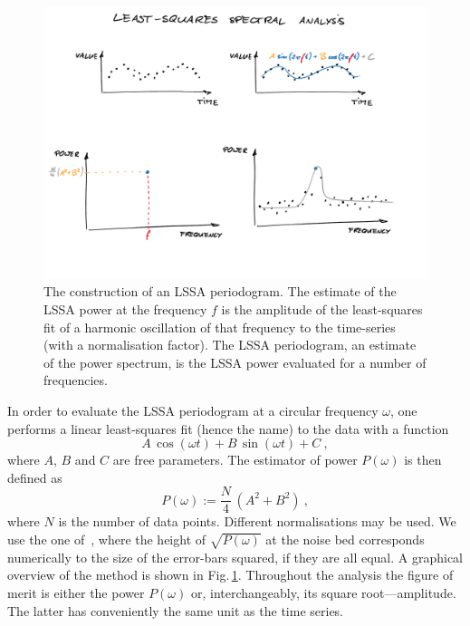 \begin{figure}
  \centering \includegraphics[width=\linewidth]{gfx/axions/LSSA}
  \caption{The construction of an LSSA periodogram. The estimate of the LSSA power at the frequency $f$ is the amplitude of the least-squares fit of a harmonic oscillation of that frequency to the time-series (with a normalisation factor). The LSSA periodogram, an estimate of the power spectrum, is the LSSA power evaluated for a number of frequencies.}\label{fig:LSSA_overview}
\end{figure}

In order to evaluate the LSSA periodogram at a circular frequency $\omega$, one performs a linear least-squares fit (hence the name) to the data with a function
\begin{equation}
  A\,\cos(\omega t) + B\,\sin(\omega t) + C \ ,
\end{equation}
where $A$, $B$ and $C$ are free parameters. The estimator of power $P(\omega)$ is then defined as
\begin{equation}
  P(\omega) := \frac{N}{4} \, \left( A^2 + B^2 \right) \ ,
\end{equation}
where $N$ is the number of data points. Different normalisations may be used.
We use the one of~\cite{Scargle1982}, where the height of $\sqrt{P(\omega)}$ at the noise bed corresponds numerically to the size of the error-bars squared, if they are all equal. A graphical overview of the method is shown in Fig.\,\ref{fig:LSSA_overview}. Throughout the analysis the figure of merit is either the power $P(\omega)$ or, interchangeably, its square root---amplitude. The latter has conveniently the same unit as the time series.

